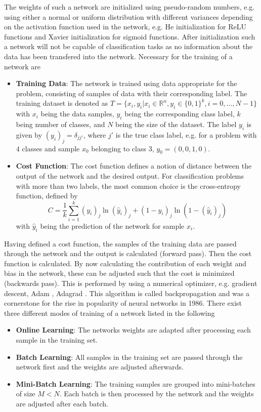 The weights of such a network are initialized using pseudo-random numbers, e.g. using either a normal or uniform distribution with different variances depending on the activation function used in the network, e.g. He initialization \cite{He2015} for ReLU functions and Xavier initialization \cite{Glorot2010} for sigmoid functions. After initialization such a network will not be capable of classification tasks as no information about the data has been transfered into the network. Necessary for the training of a network are 
\begin{itemize}
\item \textbf{Training Data}: The network is trained using data appropriate for the problem, consisting of samples of data with their corresponding label. The training dataset is denoted as $T = \{x_i, y_i | x_i\in \mathbb{R}^n, y_i \in \{0,1\}^k, i=0,\dots,N-1\}$ with $x_i$ being the data samples, $y_i$ being the corresponding class label, $k$ being number of classes, and $N$ being the size of the dataset. The label $y_i$ is given by $(y_i)_j=\delta_{jj'}$, where  $j'$ is the true class label, e.g. for a problem with $4$ classes and sample $x_0$ belonging to class $3$, $y_0 = (0,0,1,0)$.
\item \textbf{Cost Function}: The cost function defines a notion of distance between the output of the network and the desired output. For classification problems with more than two labels, the most common choice is the cross-entropy function, defined by
\begin{equation}
C = \frac{1}{k} \sum_{i=1}^k (y_i)_j \ln{(\hat{y}_i)_j} + (1-y_i)_j \ln{(1-(\hat{y}_i)_j)} 
\end{equation}
with $\hat{y}_i$ being the prediction of the network for sample $x_i$.
\end{itemize}
Having defined a cost function, the samples of the training data are passed through the network and the output is calculated (forward pass). Then the cost function is calculated. By now calculating the contribution of each weight and bias in the network, these can be adjusted such that the cost is minimized (backwards pass). This is performed by using a numerical optimizer, e.g. gradient descent, Adam \cite{Sharma2017}, Adagrad \cite{Duchi2010}. This algorithm is called backpropagation \cite{Rumelhart1986} and was a cornerstone for the rise in popularity of neural networks in 1986. There exist three different modes of training of a network listed in the following
\begin{itemize}
\item \textbf{Online Learning}: The networks weights are adapted after processing each sample in the training set.
\item \textbf{Batch Learning}: All samples in the training set are passed through the network first and the weights are adjusted afterwards.
\item \textbf{Mini-Batch Learning}: The training samples are grouped into mini-batches of size $M<N$. Each batch is then processed by the network and the weights are adjusted after each batch.
\end{itemize}
